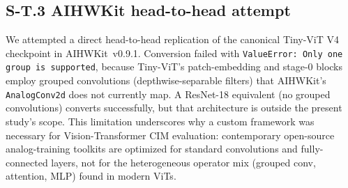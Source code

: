 \subsection*{S-T.3 AIHWKit head-to-head attempt}

We attempted a direct head-to-head replication of the canonical Tiny-ViT V4 checkpoint in AIHWKit~v0.9.1. Conversion failed with \texttt{ValueError: Only one group is supported}, because Tiny-ViT's patch-embedding and stage-0 blocks employ grouped convolutions (depthwise-separable filters) that AIHWKit's \texttt{AnalogConv2d} does not currently map. A ResNet-18 equivalent (no grouped convolutions) converts successfully, but that architecture is outside the present study's scope. This limitation underscores why a custom framework was necessary for Vision-Transformer CIM evaluation: contemporary open-source analog-training toolkits are optimized for standard convolutions and fully-connected layers, not for the heterogeneous operator mix (grouped conv, attention, MLP) found in modern ViTs.
